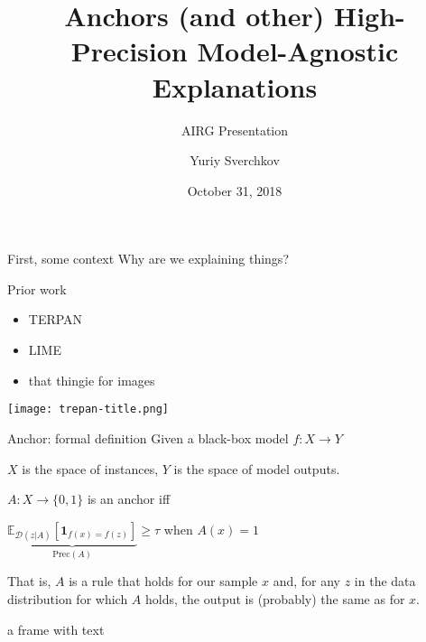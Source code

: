 \documentclass[aspectratio=169]{beamer}
\title{Anchors (and other) High-Precision Model-Agnostic Explanations}
\subtitle{AIRG Presentation}
\author{Yuriy Sverchkov}
\institute{University of Wisconsin--Madison}
\date{October 31, 2018}
\begin{document}
  {
    \begin{frame}[plain]
      \vskip4cm
      \titlepage
    \end{frame}
  }

\begin{frame}{First, some context}
Why are we explaining things?
\end{frame}
  

\begin{frame}{Prior work}
\begin{itemize}
	\item TERPAN
	\item LIME
	\item that thingie for images
\end{itemize}
\texttt{[image: trepan-title.png]}
\end{frame}


\begin{frame}{Anchor: formal definition}
  Given a black-box model $f : X \rightarrow Y$
  
  $X$ is the space of instances, $Y$ is the space of model outputs.
  
  $A : X \rightarrow \{0,1\}$ is an anchor iff
  
  $\underbrace{\mathbb{E}_{\mathcal D (z | A)} \left[ \mathbf{1}_{f(x)=f(z)} \right] }_{\mathrm{Prec}(A)} \geq \tau$ when $A(x) = 1$
  
  That is, $A$ is a rule that holds for our sample $x$ and, for any $z$ in the data distribution for which $A$ holds, the output is (probably) the same as for $x$.
\end{frame}

%
%
%
%
%
%


\begin{frame}{a frame}
with text
\end{frame}
\end{document}
